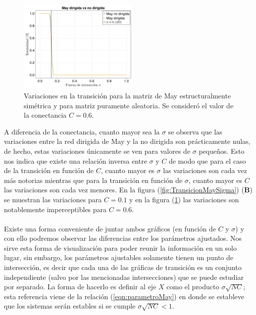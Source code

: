 \newpage
\begin{figure} \vspace{-30pt} \begin{center}
		\includegraphics[width=0.52\textwidth]{../Imagenes/TransicionσDirvsNoDir} 
	\end{center} 
	\vspace{-20pt} 
	\caption{Variaciones en la transición para la matriz de May estructuralmente simétrica y para matriz puramente aleatoria. Se consideró el valor de la conectancia $C=0.6$.} 
	\vspace{-10pt}
	\label{fig:TransicionσDirvsNoDir}
\end{figure} 
A diferencia de la conectancia, cuanto mayor sea la $\sigma$ se observa que las variaciones entre la red dirigida de May y la no dirigida son prácticamente nulas, de hecho, estas variaciones únicamente se ven para valores de $\sigma$ pequeños. Esto nos indica que existe una relación inversa entre $\sigma$ y $C$ de modo que para el caso de la transición en función de $C$, cuanto mayor es $\sigma$ las variaciones son cada vez más notorias mientras que para la transición en función de $\sigma$, cuanto mayor es $C$ las variaciones son cada vez menores. En la figura (\ref{fig:TransicionMaySigma}) (\textbf{B}) se muestran las variaciones para $C=0.1$ y en la figura (\ref{fig:TransicionσDirvsNoDir}) las variaciones son notablemente imperceptibles para $C=0.6$.
\\
\\
Existe una forma conveniente de juntar ambos gráficos (en función de $C$ y $\sigma$) y con ello podremos observar las diferencias entre los parámetros ajustados. Nos sirve esta forma de visualización para poder reunir la información en un solo lugar, sin embargo, los parámetros ajustables solamente tienen un punto de intersección, es decir que cada una de las gráficas de transición es un conjunto independiente (salvo por las mencionadas intersecciones) que se puede estudiar por separado. La forma de hacerlo es definir al eje $X$ como el producto $\sigma\sqrt{NC}$; esta referencia viene de la relación (\ref{eqn:parametroMay}) en donde se estableve que los sistemas serán estables si se cumple $\sigma\sqrt{NC}<1$. 
